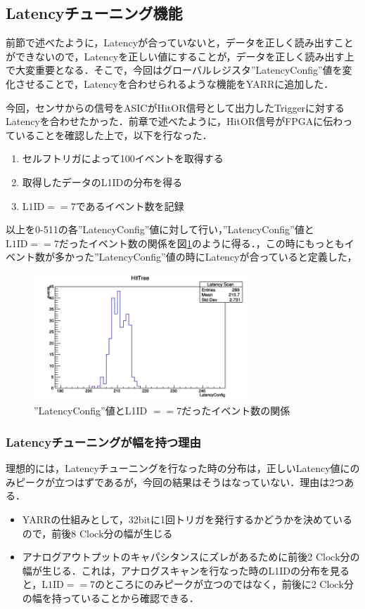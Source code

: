 \subsection{Latencyチューニング機能}
前節で述べたように，Latencyが合っていないと，データを正しく読み出すことができないので，Latencyを正しい値にすることが，データを正しく読み出す上で大変重要となる．そこで，今回はグローバルレジスタ''LatencyConfig''値を変化させることで，Latencyを合わせられるような機能をYARRに追加した．\par
今回，センサからの信号をASICがHitOR信号として出力したTriggerに対するLatencyを合わせたかった．前章で述べたように，HitOR信号がFPGAに伝わっていることを確認した上で，以下を行なった．
\begin{enumerate}
\item セルフトリガによって100イベントを取得する
\item 取得したデータのL1IDの分布を得る
\item $\mathrm{L1ID} == 7$であるイベント数を記録
\end{enumerate}
以上を0-511の各''LatencyConfig''値に対して行い，''LatencyConfig''値と$\mathrm{L1ID} == 7$だったイベント数の関係を図\ref{fig:latencydist}のように得る．，この時にもっともイベント数が多かった''LatencyConfig''値の時にLatencyが合っていると定義した，

\begin{figure}[h]
  \centering
  \includegraphics[width=8cm]{./figure/latencydist.png}
  \caption{''LatencyConfig''値とL1ID $== 7$だったイベント数の関係}
  \label{fig:latencydist}
\end{figure}


\subsubsection{Latencyチューニングが幅を持つ理由}
理想的には，Latencyチューニングを行なった時の分布は，正しいLatency値にのみピークが立つはずであるが，今回の結果はそうはなっていない．理由は2つある．
\begin{itemize}
\item YARRの仕組みとして，32bitに1回トリガを発行するかどうかを決めているので，前後8 $\mathrm{Clock}$分の幅が生じる
\item アナログアウトプットのキャパシタンスにズレがあるために前後2 $\mathrm{Clock}$分の幅が生じる．これは，アナログスキャンを行なった時のL1IDの分布を見ると，$\mathrm{L1ID} == 7$のところにのみピークが立つのではなく，前後に2 $\mathrm{Clock}$分の幅を持っていることから確認できる．
\end{itemize}

